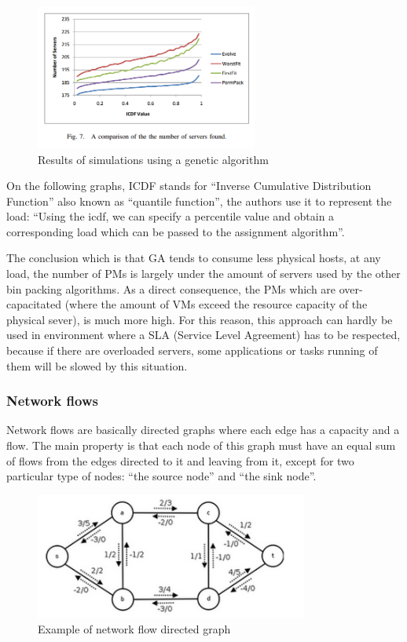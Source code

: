 \begin{figure}[H]
\begin{center}
	\includegraphics[width=0.65\textwidth]{./Images/geneticperf2.png}
	\caption{Results of simulations using a genetic algorithm\cite{algoGenetics1}}
\end{center}
\end{figure}

On the following graphs, ICDF stands for “Inverse Cumulative Distribution
Function” also known as “quantile function”, the authors use it to represent
the load: “Using the icdf, we can specify a percentile value and obtain a
corresponding load which can be passed to the assignment algorithm”.

The conclusion which is that GA tends to consume less physical hosts, at any
load, the number of PMs is largely under the amount of servers used by the
other bin packing algorithms. As a direct consequence, the PMs which are
over-capacitated (where the amount of VMs exceed the resource capacity of the
physical sever), is much more high. For this reason, this approach can hardly
be used in environment where a SLA (Service Level Agreement) has to be
respected, because if there are overloaded servers, some applications or tasks
running of them will be slowed by this situation.

\subsubsection{Network flows}

Network flows are basically directed graphs where each edge has a capacity and a flow.
The main property is that each node of this graph must have an equal sum of flows from
the edges directed to it and leaving from it, except for two particular type of nodes:
“the source node” and “the sink node”.

\begin{figure}[H]
\begin{center}
	\includegraphics[width=0.8\textwidth]{./Images/examplenetwork.png}
	\caption{Example of network flow directed graph}
\end{center}
\end{figure}

